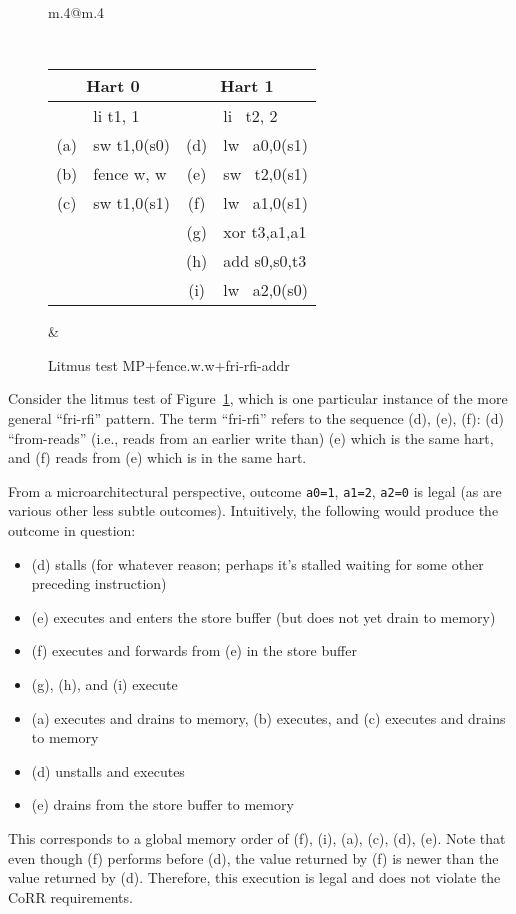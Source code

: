 \begin{figure}[h!]
  \center
  \begin{tabular}{m{.4\linewidth}@{\qquad}m{.4\linewidth}}
    {\tt\small
    \begin{tabular}{cl||cl}
    \multicolumn{2}{c}{Hart 0} & \multicolumn{2}{c}{Hart 1} \\
    \hline
          & li t1, 1    &     & li~ t2, 2    \\
      (a) & sw t1,0(s0) & (d) & lw~ a0,0(s1) \\
      (b) & fence w, w  & (e) & sw~ t2,0(s1) \\
      (c) & sw t1,0(s1) & (f) & lw~ a1,0(s1) \\
          &             & (g) & xor t3,a1,a1 \\
          &             & (h) & add s0,s0,t3 \\
          &             & (i) & lw~ a2,0(s0) \\
    \end{tabular}
  }
  &
  
  \end{tabular}
  \caption{Litmus test MP+fence.w.w+fri-rfi-addr}
  \label{fig:litmus:frirfi}
\end{figure}

Consider the litmus test of Figure~\ref{fig:litmus:frirfi}, which is one particular instance of the more general ``fri-rfi'' pattern.
The term ``fri-rfi'' refers to the sequence (d), (e), (f): (d) ``from-reads'' (i.e., reads from an earlier write than) (e) which is the same hart, and (f) reads from (e) which is in the same hart.

From a microarchitectural perspective, outcome {\tt a0=1}, {\tt a1=2}, {\tt a2=0} is legal (as are various other less subtle outcomes).  Intuitively, the following would produce the outcome in question:
\begin{itemize}
  \item (d) stalls (for whatever reason; perhaps it's stalled waiting for some other preceding instruction)
  \item (e) executes and enters the store buffer (but does not yet drain to memory)
  \item (f) executes and forwards from (e) in the store buffer
  \item (g), (h), and (i) execute
  \item (a) executes and drains to memory, (b) executes, and (c) executes and drains to memory
  \item (d) unstalls and executes
  \item (e) drains from the store buffer to memory
\end{itemize}
This corresponds to a global memory order of (f), (i), (a), (c), (d), (e).
Note that even though (f) performs before (d), the value returned by (f) is newer than the value returned by (d).
Therefore, this execution is legal and does not violate the CoRR requirements.

